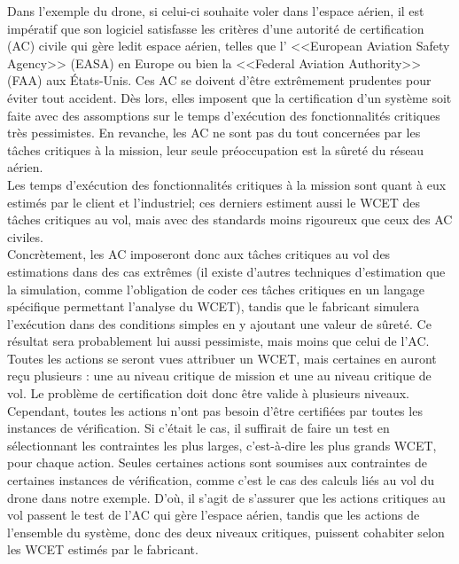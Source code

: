 \documentclass[12pt,a4paper,oneside]{book}
\theoremstyle{break}
\theoremstyle{breakplain}
\begin{document}
Dans l'exemple du drone, si celui-ci souhaite voler dans l'espace aérien, il est impératif que son logiciel satisfasse les critères d'une autorité de certification (AC) civile qui gère ledit espace aérien, telles que l’ <<European Aviation Safety Agency>> (EASA) en Europe ou bien la <<Federal Aviation Authority>> (FAA) aux États-Unis. Ces AC se doivent d'être extrêmement prudentes pour éviter tout accident. Dès lors, elles imposent que la certification d'un système soit faite avec des assomptions sur le temps d'exécution des fonctionnalités critiques très pessimistes. En revanche, les AC ne sont pas du tout concernées par les tâches critiques à la mission, leur seule préoccupation est la sûreté du réseau aérien.\\
Les temps d'exécution des fonctionnalités critiques à la mission sont quant à eux estimés par le client et l'industriel; ces derniers estiment aussi le WCET des tâches critiques au vol, mais avec des standards moins rigoureux que ceux des AC civiles.\\

Concrètement, les AC imposeront donc aux tâches critiques au vol des estimations dans des cas extrêmes (il existe d'autres techniques d'estimation que la simulation, comme l'obligation de coder ces tâches critiques en un langage spécifique permettant l'analyse du WCET), tandis que le fabricant simulera l'exécution dans des conditions simples en y ajoutant une valeur de sûreté. Ce résultat sera probablement lui aussi pessimiste, mais moins que celui de l'AC.\\

Toutes les actions se seront vues attribuer un WCET, mais certaines en auront reçu plusieurs : une au niveau critique de mission et une au niveau critique de vol. Le problème de certification doit donc être valide à plusieurs niveaux. Cependant, toutes les actions n'ont pas besoin d'être certifiées par toutes les instances de vérification. Si c'était le cas, il suffirait de faire un test en sélectionnant les contraintes les plus larges, c'est-à-dire les plus grands WCET, pour chaque action. Seules certaines actions sont soumises aux contraintes de certaines instances de vérification, comme c'est le cas des calculs liés au vol du drone dans notre exemple. D'où, il s'agit de s'assurer que les actions critiques au vol passent le test de l'AC qui gère l'espace aérien, tandis que les actions de l'ensemble du système, donc des deux niveaux critiques, puissent cohabiter selon les WCET estimés par le fabricant.\\
\end{document}
